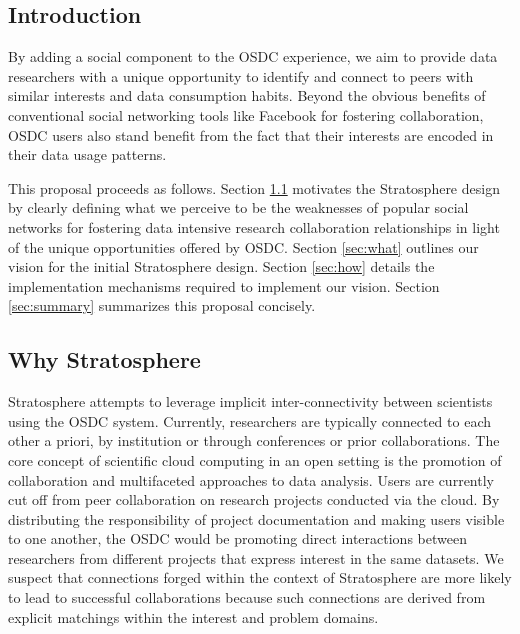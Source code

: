 \tableofcontents
\newpage
\begin{multicols*}{2}

\section{Introduction}
\label{sec:intro}


By adding a social component to the OSDC experience, we aim to provide
data researchers with a unique opportunity to identify and connect to
peers with similar interests and data consumption habits. Beyond the
obvious benefits of conventional social networking tools like Facebook
for fostering collaboration, OSDC users also stand benefit from the
fact that their interests are encoded in their data usage patterns.


This proposal proceeds as follows. Section \ref{sec:why} motivates the
Stratosphere design by clearly defining what we perceive to be the
weaknesses of popular social networks for fostering data intensive
research collaboration relationships in light of the unique
opportunities offered by OSDC. Section \ref{sec:what} outlines our
vision for the initial Stratosphere design. Section \ref{sec:how}
details the implementation mechanisms required to implement our
vision. Section \ref{sec:summary} summarizes this proposal concisely.

\subsection{Why Stratosphere}
\label{sec:why}

Stratosphere attempts to leverage implicit inter-connectivity between
scientists using the OSDC system. Currently, researchers are typically
connected to each other a priori, by institution or through
conferences or prior collaborations. The core concept of scientific
cloud computing in an open setting is the promotion of collaboration
and multifaceted approaches to data analysis. Users are currently cut
off from peer collaboration on research projects conducted via the
cloud. By distributing the responsibility of project documentation and
making users visible to one another, the OSDC would be promoting
direct interactions between researchers from different projects that
express interest in the same datasets. We suspect that connections
forged within the context of Stratosphere are more likely to lead to
successful collaborations because such connections are derived from
explicit matchings within the interest and problem domains.


\end{multicols*}
